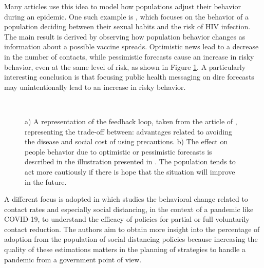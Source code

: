Many articles use this idea to model how populations adjust their behavior during an epidemic. One such example is  \cite{Auld_2003}, which focuses on the behavior of a population deciding between their sexual habits and the risk of HIV infection. The main result is derived by observing how population behavior changes as information about a possible vaccine spreads. Optimistic news lead to a decrease in the number of contacts, while pessimistic forecasts cause an increase in risky behavior, even at the same level of risk, as shown in Figure \ref{fig:abm_game}. A particularly interesting conclusion is that focusing public health messaging on dire forecasts may unintentionally lead to an increase in risky behavior.

\begin{figure}[]
	\centering
	 \quad
	 \\
	\caption[Game theory]{a) A representation of the feedback loop, taken from the article of \cite{Wang_2015}, representing the trade-off between: advantages related to avoiding the disease and social cost of using precautions.  b) The effect on people behavior due to optimistic or pessimistic forecasts is described in the illustration presented in \cite{Auld_2003}. The population tends to act more cautiously if there is hope that the situation will improve in the future.}
	\label{fig:abm_game}
\end{figure}

A different focus is adopted in \cite{Gosak_2021_game} which studies the behavioral change related to contact rates and especially social distancing, in the context of a pandemic like COVID-19, to understand the efficacy of policies for partial or full voluntarily contact reduction. The authors aim to obtain more insight into the percentage of adoption from the population of social distancing policies because increasing the quality of these estimations matters in the planning of strategies to handle a pandemic from a government point of view.

